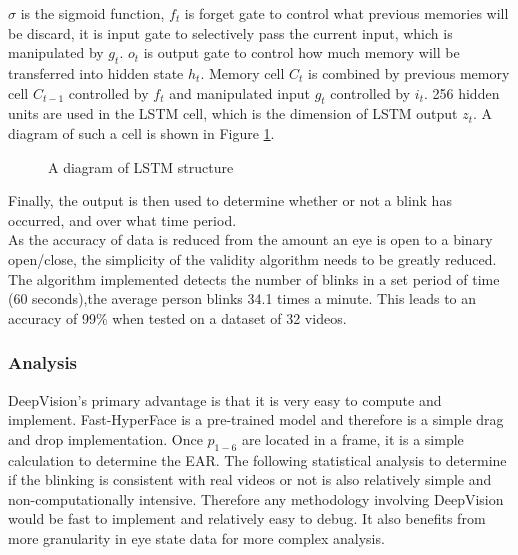 \documentclass{article}
\begin{document}
$\sigma$ is the sigmoid function, $f_t$ is forget gate to control what previous memories will be discard, it is input gate to selectively pass the current input, which is manipulated by $g_t$. $o_t$ is output gate to control how much memory will be transferred into hidden state $h_t$. Memory cell $C_t$ is combined by previous memory cell $C_{t-1}$ controlled by $f_t$ and manipulated input $g_t$ controlled by $i_t$. 256 hidden units are used in the LSTM cell, which is the dimension of LSTM output $z_t$\cite{ictuoculi}. A diagram of such a cell is shown in Figure \ref{fig:LSTM}.

\begin{figure}[H]
    \centering
    \caption{A diagram of LSTM structure\cite{ictuoculi}}
    \label{fig:LSTM}
\end{figure}

Finally, the output is then used to determine whether or not a blink has occurred, and over what time period.\\

As the accuracy of data is reduced from the amount an eye is open to a binary open/close, the simplicity of the validity algorithm needs to be greatly reduced. The algorithm implemented detects the number of blinks in a set period of time (60 seconds),the average person blinks 34.1 times a minute. This leads to an accuracy of 99\% when tested on a dataset of 32 videos.

\subsubsection{Analysis}

DeepVision's primary advantage is that it is very easy to compute and implement. Fast-HyperFace is a pre-trained model and therefore is a simple drag and drop implementation. Once $p_{1-6}$ are located in a frame, it is a simple calculation to determine the EAR. The following statistical analysis to determine if the blinking is consistent with real videos or not is also relatively simple and non-computationally intensive. Therefore any methodology involving DeepVision would be fast to implement and relatively easy to debug. It also benefits from more granularity in eye state data for more complex analysis.\\
\end{document}
